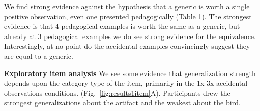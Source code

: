\documentclass[10pt,letterpaper]{article}
\begin{document}
We find strong evidence against the hypothesis that a generic is worth a single positive observation, even one presented pedagogically (Table 1).
The strongest evidence is that 4 pedagogical examples is worth the same as a generic, but already at 3 pedagogical examples we do see strong evidence for the equivalence. 
Interestingly, at no point do the accidental examples convincingly suggest they are equal to a generic.





\noindent\textbf{Exploratory item analysis}
We see some evidence that generalization strength depends upon the category-type of the item, primarily in the 1x-3x accidental observations conditions. (Fig.~\ref{fig:results1item}A).
Participants drew the strongest generalizations about the artifact and the weakest about the bird. 
\end{document}
